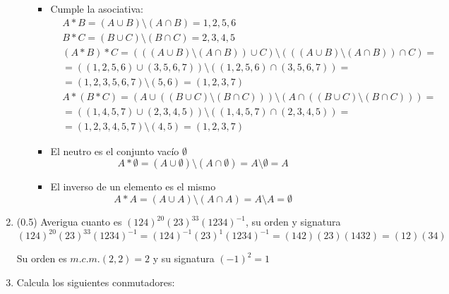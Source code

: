 \documentclass[a4paper,12pt]{article}
\begin{document}
\begin{enumerate}
\begin{enumerate}
        \begin{itemize}
            \item Cumple la asociativa:
                \begin{equation*}
                    \begin{split}
                        & A*B = (A\cup B) \setminus (A \cap B) = 1, 2, 5, 6\\
                        & B*C= (B\cup C) \setminus (B \cap C) = 2, 3, 4, 5\\
                        & (A*B)*C = (((A\cup B) \setminus (A \cap B)) \cup C) \setminus (((A \cup B) \setminus (A \cap B)) \cap C) =\\
                        & = ((1,2,5,6) \cup (3,5,6,7)) \setminus ((1,2,5,6) \cap (3,5,6,7)) = \\
                        & = (1,2,3,5,6,7) \setminus (5,6) = (1,2,3,7) \\
                        & A * (B*C) = (A \cup ((B \cup C)\setminus(B \cap C))) \setminus (A \cap ((B \cup C)\setminus(B \cap C))) =\\
                        & = ((1,4,5,7) \cup (2,3,4,5)) \setminus ((1,4,5,7)\cap (2,3,4,5)) =\\
                        & = (1,2,3,4,5,7) \setminus (4,5) = (1,2,3,7)
                    \end{split}
                \end{equation*}

            \item El neutro es el conjunto vacío $\emptyset$
                $$A*\emptyset = (A \cup \emptyset) \setminus (A \cap \emptyset) = A \setminus \emptyset = A$$

            \item El inverso de un elemento es el mismo
            $$A*A = (A \cup A)\setminus (A \cap A) = A \setminus A = \emptyset$$

        \end{itemize}

    \end{enumerate}

    \item (0.5) Averigua cuanto es $(124)^{20} (23)^{33} (1234)^{-1}$, su orden y signatura
    $$
    (124)^{20} (23)^{33} (1234)^{-1} = (124)^{-1} (23)^{1} (1234)^{-1} = (142)(23)(1432) = (12)(34)
    $$

    Su orden es $m.c.m.(2,2)=2$ y su signatura $(-1)^{2}=1$

    \item Calcula los siguientes conmutadores:


\end{enumerate}
\end{document}
